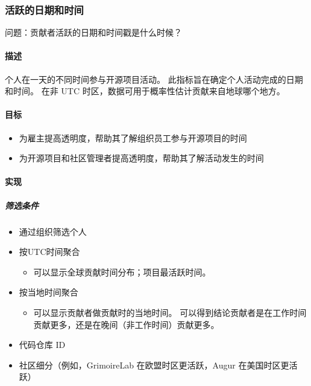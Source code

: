 \hypertarget{ux6d3bux8dc3ux7684ux65e5ux671fux548cux65f6ux95f4}{%
\subsubsection{活跃的日期和时间}\label{ux6d3bux8dc3ux7684ux65e5ux671fux548cux65f6ux95f4}}

问题：贡献者活跃的日期和时间戳是什么时候？

\hypertarget{ux63cfux8ff0}{%
\paragraph{描述}\label{ux63cfux8ff0}}

个人在一天的不同时间参与开源项目活动。
此指标旨在确定个人活动完成的日期和时间。 在非 UTC
时区，数据可用于概率性估计贡献来自地球哪个地方。

\hypertarget{ux76eeux6807}{%
\paragraph{目标}\label{ux76eeux6807}}

\begin{itemize}
\tightlist
\item
  为雇主提高透明度，帮助其了解组织员工参与开源项目的时间
\item
  为开源项目和社区管理者提高透明度，帮助其了解活动发生的时间
\end{itemize}

\hypertarget{ux5b9eux73b0}{%
\paragraph{实现}\label{ux5b9eux73b0}}

\hypertarget{ux7b5bux9009ux6761ux4ef6}{%
\subparagraph{筛选条件}\label{ux7b5bux9009ux6761ux4ef6}}

\begin{itemize}
\tightlist
\item
  通过组织筛选个人
\item
  按UTC时间聚合

  \begin{itemize}
  \tightlist
  \item
    可以显示全球贡献时间分布；项目最活跃时间。
  \end{itemize}
\item
  按当地时间聚合

  \begin{itemize}
  \tightlist
  \item
    可以显示贡献者做贡献时的当地时间。
    可以得到结论贡献者是在工作时间贡献更多，还是在晚间（非工作时间）贡献更多。
  \end{itemize}
\item
  代码仓库 ID
\item
  社区细分（例如，GrimoireLab 在欧盟时区更活跃，Augur 在美国时区更活跃）
\end{itemize}

